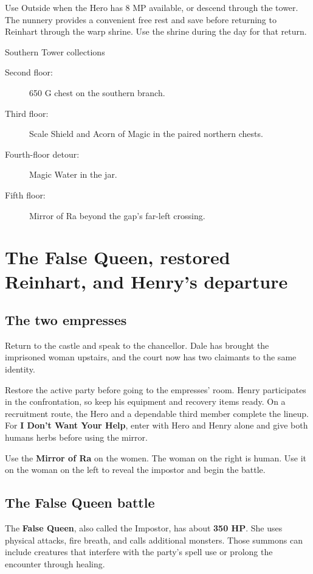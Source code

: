 Use Outside when the Hero has 8 MP available, or descend through the
tower. The nunnery provides a convenient free rest and save before
returning to Reinhart through the warp shrine. Use the shrine during
the day for that return.

\begin{routecheck}{Southern Tower collections}
\begin{description}
  \item[Second floor:] 650 G chest on the southern branch.
  \item[Third floor:] Scale Shield and Acorn of Magic in the paired
    northern chests.
  \item[Fourth-floor detour:] Magic Water in the jar.
  \item[Fifth floor:] Mirror of Ra beyond the gap's far-left crossing.
\end{description}
\end{routecheck}

\section{The False Queen, restored Reinhart, and Henry's departure}

\subsection*{The two empresses}

Return to the castle and speak to the chancellor. Dale has brought
the imprisoned woman upstairs, and the court now has two claimants
to the same identity.

Restore the active party before going to the empresses' room. Henry
participates in the confrontation, so keep his equipment and recovery
items ready. On a recruitment route, the Hero and a dependable third
member complete the lineup.
For \textbf{I Don't Want Your Help}, enter with Hero and Henry alone
and give both humans herbs before using the mirror.

Use the \textbf{Mirror of Ra} on the women. The woman on the right
is human. Use it on the woman on the left to reveal the impostor and
begin the battle.

\subsection*{The False Queen battle}

The \textbf{False Queen}, also called the Impostor, has about
\textbf{350 HP}. She uses physical attacks, fire breath, and calls
additional monsters. Those summons can include creatures that interfere
with the party's spell use or prolong the encounter through healing.

